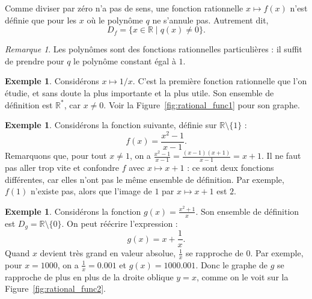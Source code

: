 \documentclass[12pt,a4paper]{article}
\theoremstyle{plain}
\theoremstyle{definition}
\newtheorem{example}[theorem]{Exemple}
\theoremstyle{remark}
\newtheorem*{remark}{Remarque}
\begin{document}
Comme diviser par zéro n'a pas de sens, une fonction rationnelle $x \mapsto f(x)$
n'est définie que pour les $x$ où le polynôme $q$ ne s'annule pas. Autrement dit,
\[
D_f = \{x \in \mathbb{R} \mid q(x) \neq 0\}.
\]

\begin{remark}
  Les polynômes sont des fonctions rationnelles particulières : il suffit de
  prendre pour $q$ le polynôme constant égal à $1$.
\end{remark}

\begin{example}
  \label{eg:one_over_x} %
  Considérons $x \mapsto 1/x$. C'est la première fonction rationnelle que l'on
  étudie, et sans doute la plus importante et la plus utile. Son ensemble de
  définition est $\mathbb{R}^*$, car $x \neq 0$. Voir la
  Figure~\ref{fig:rational_func1} pour son graphe.
\end{example}

\begin{example}
  Considérons la fonction suivante, définie sur $\mathbb{R} \setminus \{1\}$ :
  \[
  f(x) = \frac{x^2 - 1}{x - 1}.
  \]
  Remarquons que, pour tout $x \neq 1$, on a
  $\frac{x^2 - 1}{x - 1} = \frac{(x - 1)(x + 1)}{x - 1} = x + 1$.
  Il ne faut pas aller trop vite et confondre $f$ avec $x \mapsto x + 1$ : ce
  sont deux fonctions différentes, car elles n'ont pas le même ensemble de
  définition. Par exemple, $f(1)$ n'existe pas, alors que l'image de $1$ par
  $x \mapsto x + 1$ est $2$.
\end{example}

\begin{example}
  \label{eg:odd_rational} %
  Considérons la fonction $g(x) = \frac{x^2 + 1}{x}$. Son ensemble de définition
  est $D_g = \mathbb{R} \setminus \{0\}$. On peut réécrire l'expression :
  \[
  g(x) = x + \frac{1}{x}.
  \]
  Quand $x$ devient très grand en valeur absolue, $\frac{1}{x}$ se rapproche de $0$.
  Par exemple, pour $x = 1000$, on a $\frac{1}{x} = 0.001$ et $g(x) = 1000.001$.
  Donc le graphe de $g$ se rapproche de plus en plus de la droite oblique $y = x$,
  comme on le voit sur la Figure~\ref{fig:rational_func2}.
\end{example}
\end{document}
